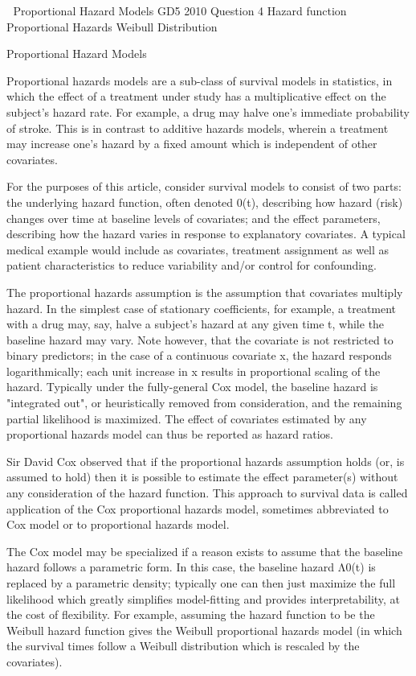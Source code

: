 

Proportional Hazard Models
GD5 2010 Question 4
Hazard function
Proportional Hazards
Weibull Distribution

Proportional Hazard Models
 
Proportional hazards models are a sub-class of survival models in statistics, in which the effect of a treatment under study has a multiplicative effect on the subject's hazard rate. For example, a drug may halve one's immediate probability of stroke. This is in contrast to additive hazards models, wherein a treatment may increase one's hazard by a fixed amount which is independent of other covariates.
 
For the purposes of this article, consider survival models to consist of two parts: the underlying hazard function, often denoted 0(t), describing how hazard (risk) changes over time at baseline levels of covariates; and the effect parameters, describing how the hazard varies in response to explanatory covariates. A typical medical example would include as covariates, treatment assignment as well as patient characteristics to reduce variability and/or control for confounding.
 
The proportional hazards assumption is the assumption that covariates multiply hazard. In the simplest case of stationary coefficients, for example, a treatment with a drug may, say, halve a subject's hazard at any given time t, while the baseline hazard may vary. Note however, that the covariate is not restricted to binary predictors; in the case of a continuous covariate x, the hazard responds logarithmically; each unit increase in x results in proportional scaling of the hazard. Typically under the fully-general Cox model, the baseline hazard is "integrated out", or heuristically removed from consideration, and the remaining partial likelihood is maximized. The effect of covariates estimated by any proportional hazards model can thus be reported as hazard ratios.
 
Sir David Cox observed that if the proportional hazards assumption holds (or, is assumed to hold) then it is possible to estimate the effect parameter(s) without any consideration of the hazard function. This approach to survival data is called application of the Cox proportional hazards model, sometimes abbreviated to Cox model or to proportional hazards model.
 
The Cox model may be specialized if a reason exists to assume that the baseline hazard follows a parametric form. In this case, the baseline hazard Λ0(t) is replaced by a parametric density; typically one can then just maximize the full likelihood which greatly simplifies model-fitting and provides interpretability, at the cost of flexibility. For example, assuming the hazard function to be the Weibull hazard function gives the Weibull proportional hazards model (in which the survival times follow a Weibull distribution which is rescaled by the covariates).
 

